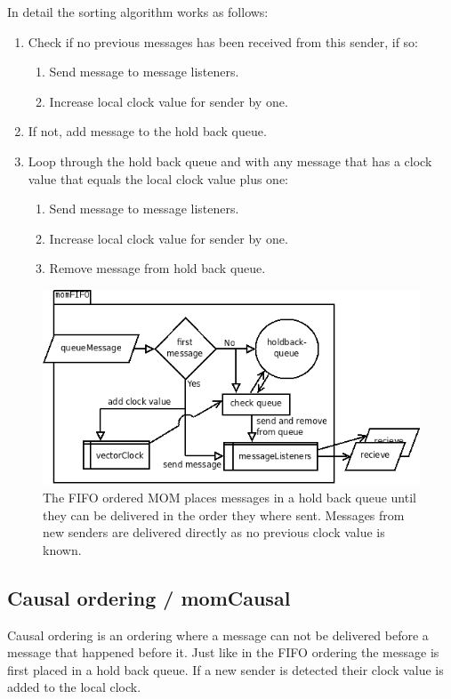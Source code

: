 \documentclass[english]{article}
\begin{document}
In detail the sorting algorithm works as follows:
\begin{enumerate}
\item Check if no previous messages has been received from this sender, if so:
	\begin{enumerate}
	\item Send message to message listeners.
	\item Increase local clock value for sender by one.
	\end{enumerate}
\item If not, add message to the hold back queue.
\item Loop through the hold back queue and with any message that has a clock value that equals the local clock value plus one:
	\begin{enumerate}
	\item Send message to message listeners.
	\item Increase local clock value for sender by one.
	\item Remove message from hold back queue.
	\end{enumerate}
\end{enumerate}

\begin{figure}
\includegraphics[width=\textwidth]{momFIFO.png}
\caption{The FIFO ordered MOM places messages in a hold back queue until they can be delivered in the order they where sent. Messages from new senders are delivered directly as no previous clock value is known.}
\label{fig:fifo}
\end{figure}

\subsection{Causal ordering / momCausal}
\label{mo-causal}
Causal ordering is an ordering where a message can not be delivered before a message that happened before it. Just like in the FIFO ordering the message is first placed in a hold back queue. If a new sender is detected their clock value is added to the local clock.
\end{document}
